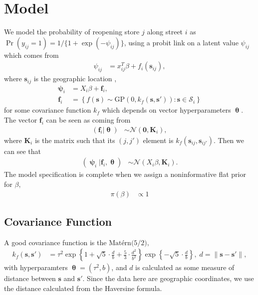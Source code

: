 \documentclass[11pt]{article}
\newcommand{\pN}{\mathcal{N}}
\newcommand{\1}{\mathbf{1}}
\newcommand{\0}{\mathbf{0}}
\newcommand{\f}{\mathbf{f}}
\newcommand{\K}{\mathbf{K}}
\newcommand{\bmpsi}{\bm{\uppsi}}
\begin{document}

\section{Model}\label{Model}

We model the probability of reopening store $j$ along street $i$ as $\Pr(y_{ij} = 1) = 1/\{ 1 + \exp(-\psi_{ij}) \}$, using a probit link on a latent value $\psi_{ij}$ which comes from 
%
%
%
\begin{align*}
	\psi_{ij} &= x_{ij}^T\beta + f_i(\mathbf{s}_{ij}),
\end{align*}
%
%
where $\mathbf{s}_{ij}$ is the geographic location ,
%
%
%
\begin{align*}
	\bmpsi_{i} &= X_i\beta + \f_i, \\
	\f_i &= \left\{ f(\mathbf{s}) \sim \text{GP}(0, k_f(\mathbf{s},\mathbf{s}')) : \mathbf{s} \in \mathcal{S}_i \right\}
\end{align*}
%
%
%
for some covariance function $k_f$ which depends on vector hyperparameters $\bm{\uptheta}$. The vector $\f_i$ can be seen as coming from 
%
%
\begin{align*}
	(\f_i | \bm{\uptheta}) &\sim \pN(\mathbf{0}, \K_{i}),
\end{align*}
%
%
%
where $\K_{i}$ is the matrix such that its $(j, j')$ element is $k_f(\mathbf{s}_{ij}, \mathbf{s}_{ij'})$. Then we can see that
%
%
%
\begin{align*}
	(\bmpsi_i | \f_i, \bm{\uptheta}) &\sim \pN(X_i\beta, \K_i).
\end{align*}
%
%
%
The model specification is complete when we assign a noninformative flat prior for $\beta,$ 
%
%
\begin{align*}
	\pi(\beta) &\propto 1
\end{align*} 




\subsection{Covariance Function}

A good covariance function is the $\text{Mat\'{e}rn(5/2)},$
%
%
%
\begin{align*}
	k_f(\mathbf{s},\mathbf{s}') &= \tau^2 \exp\left\{ 1 + \sqrt{5} \cdot \frac{d}{b} + \frac{5}{3} \cdot \frac{d^2}{b^2} \right\} \exp \left\{ -\sqrt{5} \cdot \frac{d}{b} \right \} , \; d = \| \mathbf{s} - \mathbf{s}' \|, 
\end{align*}
%
%
with hyperparamters $\bm{\uptheta} = (\tau^2, b)$, and $d$ is calculated as some measure of distance between $\mathbf{s}$ and $\mathbf{s}'.$ Since the data here are geographic coordinates, we use the distance calculated from the Haversine formula. 
\end{document}
